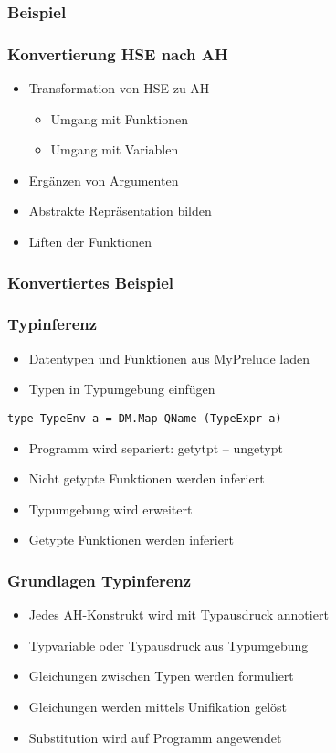 \begin{frame}[fragile]
\frametitle{Beispiel}

\end{frame}

\begin{frame}
	\frametitle{Konvertierung HSE nach AH}
	\begin{itemize}
		\item Transformation von HSE zu AH
		  \begin{itemize}
		    \item Umgang mit Funktionen
		    \item Umgang mit Variablen
		  \end{itemize}
		\item Ergänzen von Argumenten
		\item Abstrakte Repräsentation bilden
		\item Liften der Funktionen
	\end{itemize}
\end{frame}

\begin{frame}[fragile]
\frametitle{Konvertiertes Beispiel}

\end{frame}

\begin{frame}[fragile]
  \frametitle{Typinferenz}
  \begin{itemize}
    \item Datentypen und Funktionen aus \glqq{}MyPrelude\grqq{} laden
    \item Typen in Typumgebung einfügen
  \end{itemize}
  \begin{lstlisting}
type TypeEnv a = DM.Map QName (TypeExpr a)
  \end{lstlisting}
  \begin{itemize}
    \item Programm wird separiert: getytpt -- ungetypt
    \item Nicht getypte Funktionen werden inferiert
    \item Typumgebung wird erweitert
    \item Getypte Funktionen werden inferiert
  \end{itemize}
\end{frame}

\begin{frame}
  \frametitle{Grundlagen Typinferenz}
  \begin{itemize}
    \item Jedes AH-Konstrukt wird mit Typausdruck annotiert
    \item Typvariable oder Typausdruck aus Typumgebung
    \item Gleichungen zwischen Typen werden formuliert
    \item Gleichungen werden mittels Unifikation gelöst
    \item Substitution wird auf Programm angewendet
  \end{itemize}
\end{frame}


